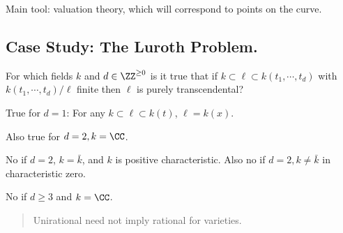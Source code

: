 Main tool: valuation theory, which will correspond to points on the
curve.

\hypertarget{case-study-the-luroth-problem.}{%
\subsection{Case Study: The Luroth
Problem.}\label{case-study-the-luroth-problem.}}

For which fields \(k\) and \(d\in \ZZ^{\geq 0}\) is it true that if
\(k \subset \ell \subset k(t_1, \cdots, t_d)\) with
\(k(t_1 ,\cdots, t_d)/\ell\) finite then \(\ell\) is purely
transcendental?

\begin{theorem}[Luroth]

True for \(d=1\): For any \(k\subset \ell \subset k(t)\),
\(\ell = k(x)\).

\end{theorem}

\begin{theorem}[Castelnuovo]

Also true for \(d=2, k=\CC\).

\end{theorem}

\begin{theorem}[Zariski]

No if \(d= 2\), \(k=\bar k\), and \(k\) is positive characteristic. Also
no if \(d=2, k\neq \bar k\) in characteristic zero.

\end{theorem}

\begin{theorem}

No if \(d\geq 3\) and \(k= \CC\).

\end{theorem}

\begin{quote}
Unirational need not imply rational for varieties.
\end{quote}

